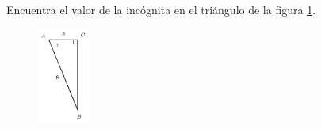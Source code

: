 \question[15]  Encuentra el valor de la incógnita en el triángulo de la figura \ref{fig:angle_functrig_17}.
\begin{figure}[H]
    \begin{center}
        \includegraphics[width=0.15\textwidth]{../images/angle_functrig_17.png}
    \end{center}
    \caption{}
    \label{fig:angle_functrig_17}
\end{figure}